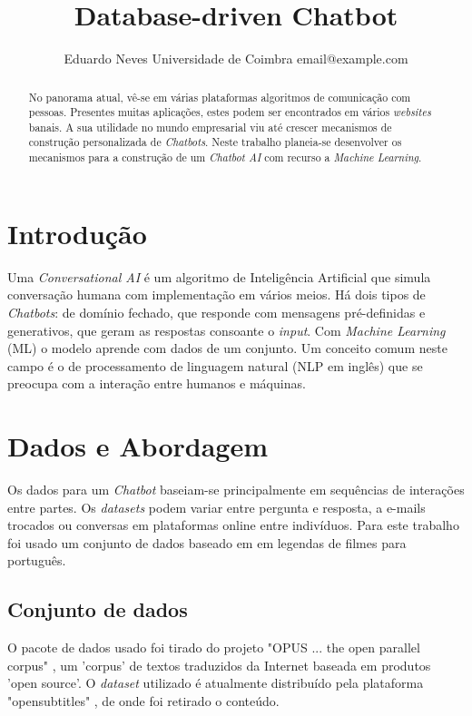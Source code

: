\documentclass{article}
\title{Database-driven Chatbot}
\author{
    Eduardo Neves
    \affiliations
    Universidade de Coimbra
    \emails
    email@example.com
}
\begin{document}
\maketitle

\begin{abstract}
No panorama atual, vê-se em várias plataformas algoritmos de comunicação com pessoas. Presentes muitas aplicações, estes podem ser encontrados em vários \textit{websites} banais. A sua utilidade no mundo empresarial viu até crescer mecanismos de construção personalizada de \textit{Chatbots}. Neste trabalho planeia-se desenvolver os mecanismos para a construção de um \textit{Chatbot AI} com recurso a \textit{Machine Learning}.
\end{abstract}

\section{Introdução}
Uma \textit{Conversational AI} é um algoritmo de Inteligência Artificial que simula conversação humana com implementação em vários meios. Há dois tipos de \textit{Chatbots}: de domínio fechado, que responde com mensagens pré-definidas e generativos, que geram as respostas consoante o \textit{input}. Com \textit{Machine Learning} (ML) o modelo aprende com dados de um conjunto. Um conceito comum neste campo é o de processamento de linguagem natural (NLP em inglês) que se preocupa com a interação entre humanos e máquinas. 


\section{Dados e Abordagem}
Os dados para um \textit{Chatbot} baseiam-se principalmente em sequências de interações entre partes. Os \textit{datasets} podem variar entre pergunta e resposta, a e-mails trocados ou conversas em plataformas online entre indivíduos. Para este trabalho foi usado um conjunto de dados baseado em em legendas de filmes para português.

\subsection{Conjunto de dados}
O pacote de dados usado foi tirado do projeto "OPUS ... the open parallel corpus" \cite{opus}, um 'corpus' de textos traduzidos da Internet baseada em produtos 'open source'. O \textit{dataset} utilizado é atualmente distribuído pela plataforma "opensubtitles" \cite{opensubtitles}, de onde foi retirado o conteúdo.
\end{document}
